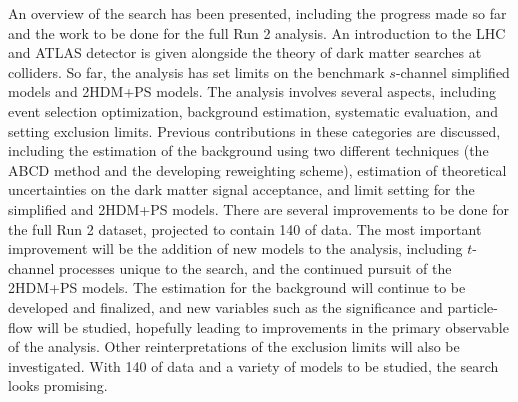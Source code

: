 \label{chapter:conclusions}

An overview of the \monoZ search has been presented, including the progress made so far and the work to be done for the full Run 2 analysis. An introduction to the LHC and ATLAS detector is given alongside the theory of dark matter searches at colliders. So far, the \monoZ analysis has set limits on the benchmark $s$-channel simplified models and 2HDM+PS models. The analysis involves several aspects, including event selection optimization, background estimation, systematic evaluation, and setting exclusion limits. Previous contributions in these categories are discussed, including the estimation of the \Zjets background using two different techniques (the ABCD method and the developing \gjets reweighting scheme), estimation of theoretical uncertainties on the dark matter signal acceptance, and limit setting for the simplified and 2HDM+PS models. There are several improvements to be done for the full Run 2 dataset, projected to contain 140 \ifb of data. The most important improvement will be the addition of new models to the analysis, including $t$-channel processes unique to the \monoZ search, and the continued pursuit of the 2HDM+PS models. The \gjets estimation for the \Zjets background will continue to be developed and finalized, and new variables such as the \etmiss significance and particle-flow \etmiss will be studied, hopefully leading to improvements in the primary observable of the analysis. Other reinterpretations of the \monoZ exclusion limits will also be investigated. With 140 \ifb of data and a variety of models to be studied, the \monoZ search looks promising.